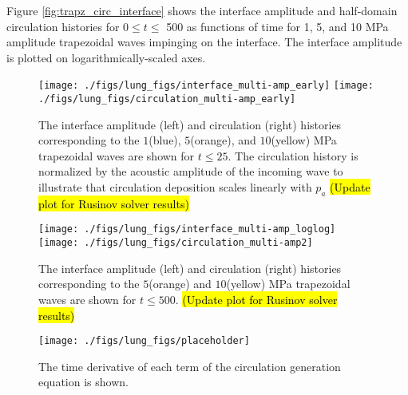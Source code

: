Figure \ref{fig:trapz_circ_interface} shows the interface amplitude
and half-domain circulation histories for 0$\leq t\leq$ 500 as
functions of time for 1, 5, and 10 MPa amplitude trapezoidal
waves impinging on the interface. The interface amplitude is plotted
on logarithmically-scaled axes. 

\begin{figure}[h] 
  \centering
  \texttt{[image: ./figs/lung\_figs/interface\_multi-amp\_early]}
  \texttt{[image: ./figs/lung\_figs/circulation\_multi-amp\_early]}
  \caption{The interface amplitude (left) and circulation (right) histories corresponding to the $1$(blue), $5$(orange), and $10$(yellow) MPa trapezoidal waves are shown for $t\leq 25$. The circulation history is normalized by the acoustic amplitude of the incoming wave to illustrate that circulation deposition scales linearly with $p_a$ \hl{(Update plot for Rusinov solver results)} }
  \label{fig:trapz_circ_interface_early}
\end{figure}

\begin{figure}[h] 
  \centering
  \texttt{[image: ./figs/lung\_figs/interface\_multi-amp\_loglog]}
  \texttt{[image: ./figs/lung\_figs/circulation\_multi-amp2]}
  \caption{The interface amplitude (left) and circulation (right) histories corresponding to the $5$(orange) and $10$(yellow) MPa trapezoidal waves are shown for $t\leq 500$. \hl{(Update plot for Rusinov solver results)}}
  \label{fig:trapz_circ_interface_loglog}
\end{figure}

\begin{figure}[h] 
  \centering
  \texttt{[image: ./figs/lung\_figs/placeholder]}
  \caption{The time derivative of each term of the circulation generation equation is shown.}
  \label{fig:trapz_ddt_circ}
\end{figure}


